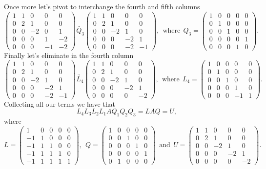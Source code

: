 Once more let's pivot to interchange the fourth and fifth columns
\[ 
    \begin{pmatrix}1&1&0&0&0\\ 0&2&1&0&0\\ 0&0&-2&0&1\\ 0&0&0&1&-2\\ 0&0&0&-1&-2\end{pmatrix} \underrightarrow{Q_3} \begin{pmatrix}1&1&0&0&0\\ 0&2&1&0&0\\ 0&0&-2&1&0\\ 0&0&0&-2&1\\ 0&0&0&-2&-1\end{pmatrix}, ~~ \text{where}~~ Q_3 = \begin{pmatrix}1&0&0&0&0\\ 0&1&0&0&0\\ 0&0&1&0&0\\ 0&0&0&0&1\\ 0&0&0&1&0\end{pmatrix}.
\]
Finally let's eliminate in the fourth column
\[ 
    \begin{pmatrix}1&1&0&0&0\\ 0&2&1&0&0\\ 0&0&-2&1&0\\ 0&0&0&-2&1\\ 0&0&0&-2&-1\end{pmatrix} \underrightarrow{L_4} \begin{pmatrix}1&1&0&0&0\\ 0&2&1&0&0\\ 0&0&-2&1&0\\ 0&0&0&-2&1\\ 0&0&0&0&-2\end{pmatrix}, ~~ \text{where}~~ L_4 = \begin{pmatrix}1&0&0&0&0\\ 0&1&0&0&0\\ 0&0&1&0&0\\ 0&0&0&1&0\\ 0&0&0&-1&1\end{pmatrix}.
\]
Collecting all our terms we have that
\[ L_4L_3L_2L_1AQ_1Q_2Q_3 = LAQ = U,\]
where
\[L = \begin{pmatrix}1&0&0&0&0\\ -1&1&0&0&0\\ -1&1&1&0&0\\ -1&1&1&1&0\\ -1&1&1&1&1\end{pmatrix}, ~~ Q = \begin{pmatrix}1&0&0&0&0\\ 0&0&1&0&0\\ 0&0&0&1&0\\ 0&0&0&0&1\\ 0&1&0&0&0\end{pmatrix} ~~ \text{and} ~~ U = \begin{pmatrix}1&1&0&0&0\\ 0&2&1&0&0\\ 0&0&-2&1&0\\ 0&0&0&-2&1\\ 0&0&0&0&-2\end{pmatrix}.\] 